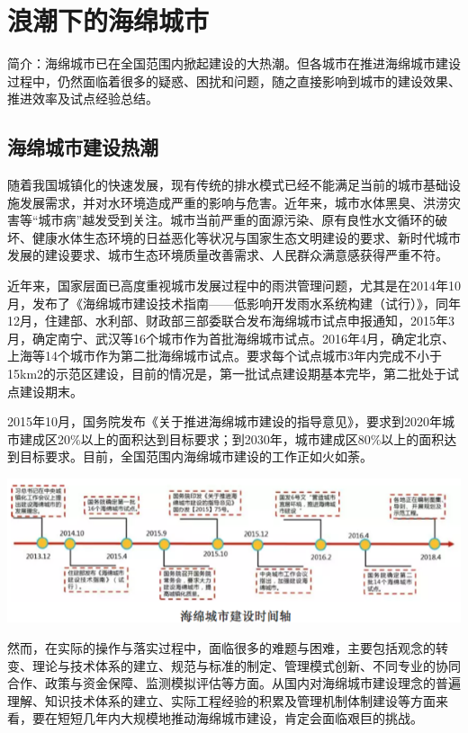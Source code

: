 \documentclass[]{book}
\begin{document}
\hypertarget{ux6d6aux6f6eux4e0bux7684ux6d77ux7ef5ux57ceux5e02}{%
\section{浪潮下的海绵城市}\label{ux6d6aux6f6eux4e0bux7684ux6d77ux7ef5ux57ceux5e02}}

简介：海绵城市已在全国范围内掀起建设的大热潮。但各城市在推进海绵城市建设过程中，仍然面临着很多的疑惑、困扰和问题，随之直接影响到城市的建设效果、推进效率及试点经验总结。

\hypertarget{ux6d77ux7ef5ux57ceux5e02ux5efaux8bbeux70edux6f6e}{%
\subsection{海绵城市建设热潮}\label{ux6d77ux7ef5ux57ceux5e02ux5efaux8bbeux70edux6f6e}}

随着我国城镇化的快速发展，现有传统的排水模式已经不能满足当前的城市基础设施发展需求，并对水环境造成严重的影响与危害。近年来，城市水体黑臭、洪涝灾害等``城市病''越发受到关注。城市当前严重的面源污染、原有良性水文循环的破坏、健康水体生态环境的日益恶化等状况与国家生态文明建设的要求、新时代城市发展的建设要求、城市生态环境质量改善需求、人民群众满意感获得严重不符。

近年来，国家层面已高度重视城市发展过程中的雨洪管理问题，尤其是在2014年10月，发布了《海绵城市建设技术指南------低影响开发雨水系统构建（试行）》，同年12月，住建部、水利部、财政部三部委联合发布海绵城市试点申报通知，2015年3月，确定南宁、武汉等16个城市作为首批海绵城市试点。2016年4月，确定北京、上海等14个城市作为第二批海绵城市试点。要求每个试点城市3年内完成不小于15km2的示范区建设，目前的情况是，第一批试点建设期基本完毕，第二批处于试点建设期末。

2015年10月，国务院发布《关于推进海绵城市建设的指导意见》，要求到2020年城市建成区20\%以上的面积达到目标要求；到2030年，城市建成区80\%以上的面积达到目标要求。目前，全国范围内海绵城市建设的工作正如火如荼。

\includegraphics[width=8.33in]{images/hm1}

然而，在实际的操作与落实过程中，面临很多的难题与困难，主要包括观念的转变、理论与技术体系的建立、规范与标准的制定、管理模式创新、不同专业的协同合作、政策与资金保障、监测模拟评估等方面。从国内对海绵城市建设理念的普遍理解、知识技术体系的建立、实际工程经验的积累及管理机制体制建设等方面来看，要在短短几年内大规模地推动海绵城市建设，肯定会面临艰巨的挑战。
\end{document}
